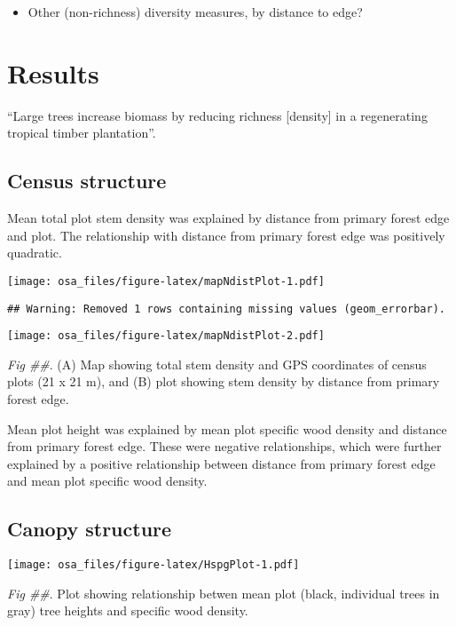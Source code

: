 \documentclass[]{article}
\providecommand{\tightlist}{%
  \setlength{\itemsep}{0pt}\setlength{\parskip}{0pt}}
\begin{document}
\begin{itemize}
\tightlist
\item
  Other (non-richness) diversity measures, by distance to edge?
\end{itemize}

\hypertarget{results}{%
\section{Results}\label{results}}

``Large trees increase biomass by reducing richness {[}density{]} in a
regenerating tropical timber plantation''.

\hypertarget{census-structure-1}{%
\subsection{Census structure}\label{census-structure-1}}

Mean total plot stem density was explained by distance from primary
forest edge and plot. The relationship with distance from primary forest
edge was positively quadratic.

\texttt{[image: osa\_files/figure-latex/mapNdistPlot-1.pdf]}

\begin{verbatim}
## Warning: Removed 1 rows containing missing values (geom_errorbar).
\end{verbatim}

\texttt{[image: osa\_files/figure-latex/mapNdistPlot-2.pdf]}

\emph{Fig \#\#}. (A) Map showing total stem density and GPS coordinates
of census plots (21 x 21 m), and (B) plot showing stem density by
distance from primary forest edge.

Mean plot height was explained by mean plot specific wood density and
distance from primary forest edge. These were negative relationships,
which were further explained by a positive relationship between distance
from primary forest edge and mean plot specific wood density.

\hypertarget{canopy-structure-1}{%
\subsection{Canopy structure}\label{canopy-structure-1}}

\texttt{[image: osa\_files/figure-latex/HspgPlot-1.pdf]}

\emph{Fig \#\#}. Plot showing relationship betwen mean plot (black,
individual trees in gray) tree heights and specific wood density.
\end{document}
